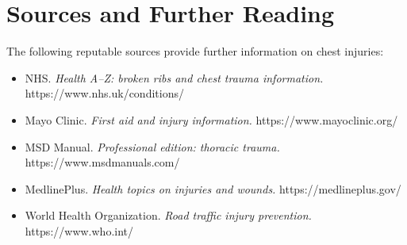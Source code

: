 \section*{Sources and Further Reading}
The following reputable sources provide further information on chest injuries:
\begin{itemize}
    \item NHS. \textit{Health A--Z: broken ribs and chest trauma information.} https://www.nhs.uk/conditions/
    \item Mayo Clinic. \textit{First aid and injury information.} https://www.mayoclinic.org/
    \item MSD Manual. \textit{Professional edition: thoracic trauma.} https://www.msdmanuals.com/
    \item MedlinePlus. \textit{Health topics on injuries and wounds.} https://medlineplus.gov/
    \item World Health Organization. \textit{Road traffic injury prevention.} https://www.who.int/
\end{itemize}
